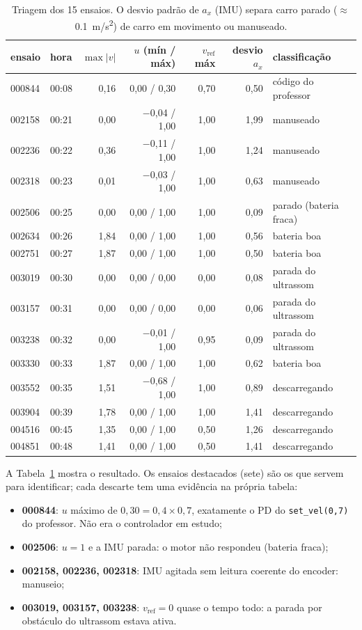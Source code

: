 \documentclass[11pt,a4paper,oneside,openany]{book}
\newcommand{\code}[1]{\texttt{#1}}
\begin{document}
\begin{table}[ht]
\centering\small
\caption{Triagem dos 15 ensaios. O desvio padrão de $a_x$ (IMU) separa carro parado
($\approx$\SI{0,1}{m/s^2}) de carro em movimento ou manuseado.}
\label{tab:triagem}
\begin{tabular}{llrrrrl}
\toprule
ensaio & hora & $\max|v|$ & $u$ (mín / máx) & $v_{\text{ref}}$ máx & desvio $a_x$ & classificação\\
\midrule
000844 & 00:08 & 0,16 & 0,00 / 0,30 & 0,70 & 0,50 & código do professor\\
002158 & 00:21 & 0,00 & $-$0,04 / 1,00 & 1,00 & 1,99 & manuseado\\
002236 & 00:22 & 0,36 & $-$0,11 / 1,00 & 1,00 & 1,24 & manuseado\\
002318 & 00:23 & 0,01 & $-$0,03 / 1,00 & 1,00 & 0,63 & manuseado\\
002506 & 00:25 & 0,00 & 0,00 / 1,00 & 1,00 & 0,09 & parado (bateria fraca)\\
\rowcolor{azul!6}002634 & 00:26 & 1,84 & 0,00 / 1,00 & 1,00 & 0,56 & bateria boa\\
\rowcolor{azul!6}002751 & 00:27 & 1,87 & 0,00 / 1,00 & 1,00 & 0,50 & bateria boa\\
003019 & 00:30 & 0,00 & 0,00 / 0,00 & 0,00 & 0,08 & parada do ultrassom\\
003157 & 00:31 & 0,00 & 0,00 / 0,00 & 0,00 & 0,06 & parada do ultrassom\\
003238 & 00:32 & 0,00 & $-$0,01 / 1,00 & 0,95 & 0,09 & parada do ultrassom\\
\rowcolor{azul!6}003330 & 00:33 & 1,87 & 0,00 / 1,00 & 1,00 & 0,62 & bateria boa\\
\rowcolor{azul!6}003552 & 00:35 & 1,51 & $-$0,68 / 1,00 & 1,00 & 0,89 & descarregando\\
\rowcolor{azul!6}003904 & 00:39 & 1,78 & 0,00 / 1,00 & 1,00 & 1,41 & descarregando\\
\rowcolor{azul!6}004516 & 00:45 & 1,35 & 0,00 / 1,00 & 0,50 & 1,26 & descarregando\\
\rowcolor{azul!6}004851 & 00:48 & 1,41 & 0,00 / 1,00 & 0,50 & 1,41 & descarregando\\
\bottomrule
\end{tabular}
\end{table}

A Tabela~\ref{tab:triagem} mostra o resultado. Os ensaios destacados (sete) são os que
servem para identificar; cada descarte tem uma evidência na própria tabela:
\begin{itemize}\itemsep0pt
  \item \textbf{000844}: $u$ máximo de $0{,}30 = 0{,}4 \times 0{,}7$, exatamente o PD do
    \code{set\_vel(0,7)} do professor. Não era o controlador em estudo;
  \item \textbf{002506}: $u = 1$ e a IMU parada: o motor não respondeu (bateria fraca);
  \item \textbf{002158, 002236, 002318}: IMU agitada sem leitura coerente do encoder:
    manuseio;
  \item \textbf{003019, 003157, 003238}: $v_{\text{ref}} = 0$ quase o tempo todo: a
    parada por obstáculo do ultrassom estava ativa.
\end{itemize}
\end{document}
